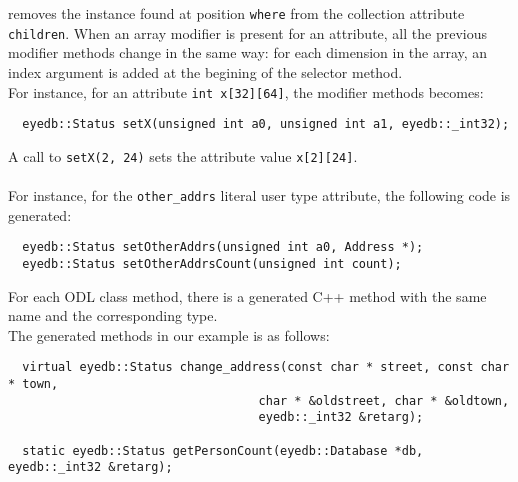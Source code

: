 \normalsize
removes the instance found at position \texttt{where}
from the collection attribute \texttt{children}.
\ee
{}
When an array modifier is present for an attribute, all the previous
modifier methods change in the same way: for each dimension in the
array, an index argument is added at the begining of the selector method.
\\
For instance, for an attribute \texttt{int x[32][64]}, the modifier methods
becomes:
\verbsize
\begin{verbatim}
  eyedb::Status setX(unsigned int a0, unsigned int a1, eyedb::_int32);
\end{verbatim}
\normalsize
A call to \texttt{setX(2, 24)} sets the attribute value \texttt{x[2][24]}.
\\
\\
For instance,
for the \texttt{other\_addrs} literal user type attribute, the following
code is generated:
\verbsize
\begin{verbatim}
  eyedb::Status setOtherAddrs(unsigned int a0, Address *);
  eyedb::Status setOtherAddrsCount(unsigned int count);
\end{verbatim}
\normalsize
{}
For each ODL class method, there is a generated C++ method with
the same name and the corresponding type.
\\
The generated methods in our example is as follows:
\verbsize
\begin{verbatim}
  virtual eyedb::Status change_address(const char * street, const char * town,
                                   char * &oldstreet, char * &oldtown,
                                   eyedb::_int32 &retarg);

  static eyedb::Status getPersonCount(eyedb::Database *db, eyedb::_int32 &retarg);
\end{verbatim}
\normalsize


